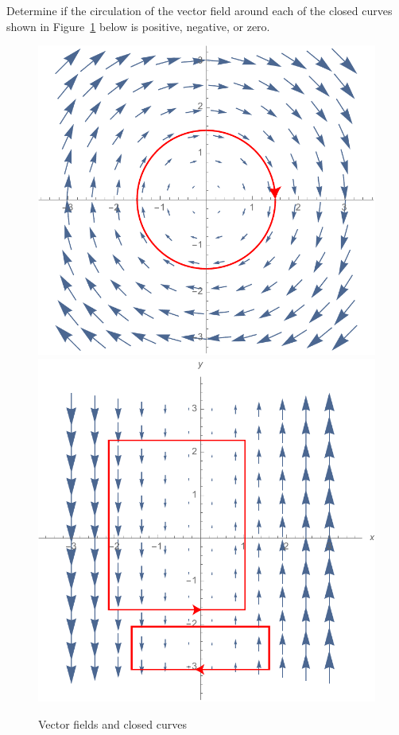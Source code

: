 \begin{activity} \label{A:12.2.4}  
\nin Determine if the circulation of the vector field around each of the
closed curves shown in Figure~\ref{F:12.2-circ} below is positive, negative, or zero.
\begin{figure}[h]
  \centering
  \includegraphics[width=0.45\linewidth]{figures/fig_12_2_circ_circle.pdf}  \includegraphics[width=0.45\linewidth]{figures/fig_12_2_circ_box.pdf}
  \caption{Vector fields and closed curves}\label{F:12.2-circ}
\end{figure} 
\end{activity}
\begin{smallhint}

\end{smallhint}
\begin{bighint}

\end{bighint}
\begin{activitySolution}

\end{activitySolution}
\aftera

